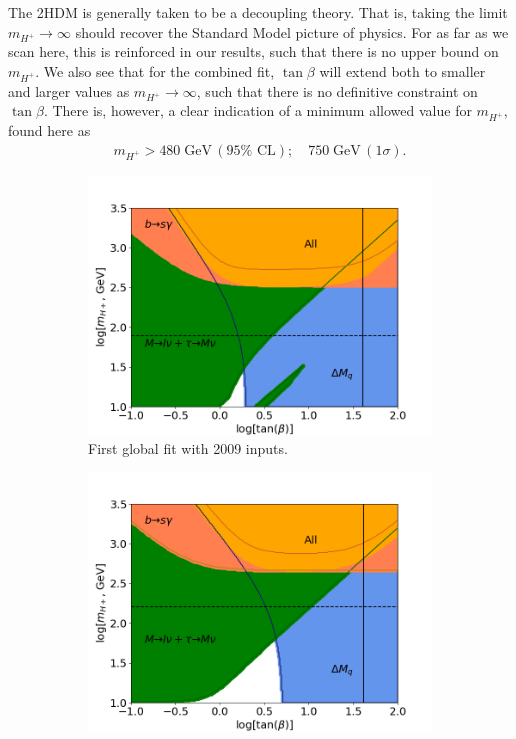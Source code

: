 \documentclass[a4paper,12pt]{article}
\begin{document}
The 2HDM is generally taken to be a decoupling theory. 
That is, taking the limit $m_{H^+} \to \infty$ should recover the Standard Model picture of physics.
For as far as we scan here, this is reinforced in our results, such that there is no upper bound on $m_{H^+}$. 
We also see that for the combined fit, $\tan\beta$ will extend both to smaller and larger values as $m_{H^+}\to\infty$, such that there is no definitive constraint on $\tan\beta$. 
There is, however, a clear indication of a minimum allowed value for $m_{H^+}$, found here as
\begin{align}
    \label{eq:const}
    m_{H^+} > 480 \;\text{GeV}\, (95\% \text{ CL});\quad 750 \;\text{GeV}\, (1\sigma).
\end{align}
\begin{figure}[ht]
    \centering
    \begin{subfigure}[b]{0.48\textwidth}
        \includegraphics[width=\textwidth]{global08.png}
        \caption{\label{subfig:glob08}First global fit with 2009 inputs.}
    \end{subfigure}
    \begin{subfigure}[b]{0.48\textwidth}
        \includegraphics[width=\textwidth]{../global/global_test_min.png}

\end{subfigure}
\end{figure}
\end{document}
